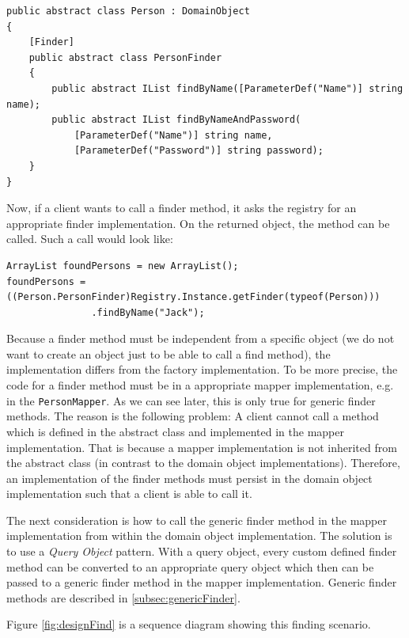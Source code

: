 			\begin{lstlisting}[float=htb,language={[Sharp]C},caption=Defining a Finder Class,
			label=lst:finderClass]
public abstract class Person : DomainObject
{
	[Finder]
	public abstract class PersonFinder
	{
		public abstract IList findByName([ParameterDef("Name")] string name);
		public abstract IList findByNameAndPassword(
			[ParameterDef("Name")] string name,
			[ParameterDef("Password")] string password);
	}
}
			\end{lstlisting}
		
		Now, if a client wants to call a finder method, it asks the registry for an appropriate 
		finder implementation. On the returned object, the method can be called. Such a call would
		look like:
			
			\begin{Verbatim}
ArrayList foundPersons = new ArrayList();
foundPersons = ((Person.PersonFinder)Registry.Instance.getFinder(typeof(Person)))
               .findByName("Jack");
			\end{Verbatim}
			
			Because a finder method must be independent from a specific object (we do not want
			to create an object just to be able to call a find method), the implementation
			differs from the factory implementation. To be more precise, the code for
			a finder method must be in a appropriate mapper implementation, e.g. in the
			\verb~PersonMapper~. As we can see later, this is only true for generic finder methods.
			The reason is the following problem: A client cannot call
			a method which is defined in the abstract class and implemented in the mapper implementation.
			That is because a mapper implementation is not inherited from the abstract class
			(in contrast to the domain object implementations).
			Therefore, an implementation of the finder
			methods must persist in the domain object implementation such that a client is
			able to call it.
			
			The next consideration is how to call the generic finder method in the mapper implementation
			from within the domain object implementation. The solution is to use a 
			\textit{Query Object} pattern. With a query object, every custom defined finder method
			can be converted to an appropriate query object which then can be passed to 
			a generic finder method in the mapper implementation. Generic finder methods are described
			in \ref{subsec:genericFinder}.
			
			Figure \ref{fig:designFind} is a sequence diagram showing this finding scenario.
			
